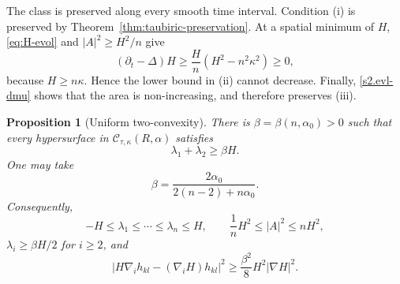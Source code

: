 \documentclass[11pt,reqno]{amsart}
\newtheorem{proposition}{Proposition}[section]
\theoremstyle{definition}
\theoremstyle{remark}
\numberwithin{equation}{section}
\newcommand{\CC}{\mathcal C}
\begin{document}
The class is preserved along every smooth time interval.  Condition
\textup{(i)} is preserved by
Theorem~\ref{thm:taubiric-preservation}.  At a spatial minimum of $H$,
\eqref{eq:H-evol} and $|A|^2\geq H^2/n$ give
\begin{equation*}
 (\partial_t-\Delta)H
 \geq \frac{H}{n}(H^2-n^2\kappa^2)\geq0,
\end{equation*}
because $H\geq n\kappa$.  Hence the lower bound in \textup{(ii)} cannot
decrease.  Finally, \eqref{s2.evl-dmu}  
shows that the area is non-increasing, and therefore preserves
\textup{(iii)}.

\begin{proposition}[Uniform two-convexity]
\label{prop:uniform-two-convexity}
There is $\beta=\beta(n,\alpha_0)>0$ such that every hypersurface in
$\CC_{\tau,\kappa}(R,\alpha)$ satisfies
\begin{equation}\label{eq:uniform-two-convexity}
 \lambda_1+\lambda_2\geq\beta H.
\end{equation}
One may take
\begin{equation}\label{eq:beta-tau}
 \beta=\frac{2\alpha_0}{2(n-2)+n\alpha_0}.
\end{equation}
Consequently,
\begin{equation*}
 -H\leq\lambda_1\leq\cdots\leq\lambda_n\leq H,
 \qquad \frac1nH^2\leq|A|^2\leq nH^2,
\end{equation*}
$\lambda_i\geq\beta H/2$ for $i\geq2$, and
\begin{equation}\label{eq:kato-hs}
 |H\nabla_i h_{kl}-(\nabla_iH)h_{kl}|^2
 \geq\frac{\beta^2}{8}H^2|\nabla H|^2.
\end{equation}
\end{proposition}
\end{document}
